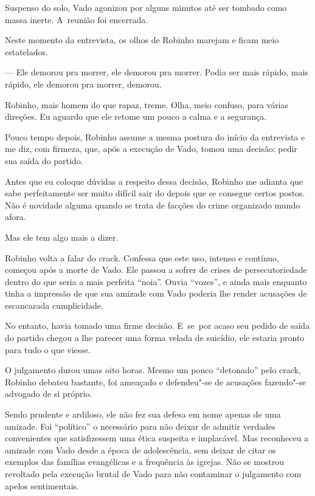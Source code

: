 Suspenso do solo, Vado agonizou por alguns minutos até ser tombado como
massa inerte. A~reunião foi encerrada.

\asterisc{}

Neste momento da entrevista, os olhos de Robinho marejam e ficam meio
estatelados.

— Ele demorou pra morrer, ele demorou pra morrer. Podia ser mais rápido,
mais rápido, ele demorou pra morrer, demorou.

Robinho, mais homem do que rapaz, treme. Olha, meio confuso, para
várias direções. Eu aguardo que ele retome um pouco a calma e a
segurança.

Pouco tempo depois, Robinho assume a mesma postura do início da
entrevista e me diz, com firmeza, que, após a execução de Vado, tomou
uma decisão: pedir sua saída do partido.

Antes que eu coloque dúvidas a respeito dessa decisão, Robinho me
adianta que sabe perfeitamente ser muito difícil sair do  depois que
se consegue certos postos. Não é novidade alguma quando se trata de
facções do crime organizado mundo afora.

Mas ele tem algo mais a dizer.

\asterisc

Robinho volta a falar do crack. Confessa que este uso, intenso e
contínuo, começou após a morte de Vado. Ele passou a sofrer de crises
de persecutoriedade dentro do que seria a mais perfeita ``noia''. Ouvia
``vozes'', e ainda mais enquanto tinha a impressão de que sua amizade
com Vado poderia lhe render acusações de escancarada cumplicidade.

No entanto, havia tomado uma firme decisão. E~se~por acaso seu pedido de
saída do partido chegou a lhe parecer uma forma velada de suicídio, ele
estaria pronto para tudo o que viesse.

O julgamento durou umas oito horas. Mesmo um pouco ``detonado'' pelo
crack, Robinho debateu bastante, foi ameaçado e defendeu"-se de
acusações fazendo"-se advogado de si próprio.

Sendo prudente e ardiloso, ele não fez sua defesa em nome apenas de uma
amizade. Foi ``político'' o necessário para não deixar de admitir
verdades convenientes que satisfizessem uma ética suspeita e implacável.
Mas reconheceu a amizade com Vado desde a época de adolescência, sem
deixar de citar os exemplos das famílias evangélicas e a frequência às
igrejas. Não se mostrou revoltado pela execução brutal de Vado para não
contaminar o julgamento com apelos sentimentais.

